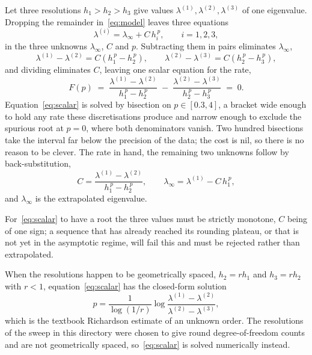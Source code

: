 \documentclass[11pt,a4paper]{article}
\begin{document}
Let three resolutions $h_1 > h_2 > h_3$ give values $\lambda^{(1)},
\lambda^{(2)}, \lambda^{(3)}$ of one eigenvalue. Dropping the remainder
in~\eqref{eq:model} leaves three equations
\begin{equation}
  \lambda^{(i)} = \lambda_\infty + C\,h_i^{\,p},
  \qquad i = 1,2,3,
  \label{eq:three}
\end{equation}
in the three unknowns $\lambda_\infty$, $C$ and $p$. Subtracting them in pairs
eliminates $\lambda_\infty$,
\begin{equation}
  \lambda^{(1)} - \lambda^{(2)} = C\left(h_1^{\,p} - h_2^{\,p}\right),
  \qquad
  \lambda^{(2)} - \lambda^{(3)} = C\left(h_2^{\,p} - h_3^{\,p}\right),
\end{equation}
and dividing eliminates $C$, leaving one scalar equation for the rate,
\begin{equation}
  F(p) \;=\;
  \frac{\lambda^{(1)} - \lambda^{(2)}}{h_1^{\,p} - h_2^{\,p}}
  \;-\;
  \frac{\lambda^{(2)} - \lambda^{(3)}}{h_2^{\,p} - h_3^{\,p}}
  \;=\; 0 .
  \label{eq:scalar}
\end{equation}
Equation~\eqref{eq:scalar} is solved by bisection on $p \in [0.3, 4]$, a bracket
wide enough to hold any rate these discretisations produce and narrow enough to
exclude the spurious root at $p = 0$, where both denominators vanish. Two hundred
bisections take the interval far below the precision of the data; the cost is
nil, so there is no reason to be clever. The rate in hand, the remaining two
unknowns follow by back-substitution,
\begin{equation}
  C = \frac{\lambda^{(1)} - \lambda^{(2)}}{h_1^{\,p} - h_2^{\,p}},
  \qquad
  \lambda_\infty = \lambda^{(1)} - C\,h_1^{\,p},
  \label{eq:back}
\end{equation}
and $\lambda_\infty$ is the extrapolated eigenvalue.

For~\eqref{eq:scalar} to have a root the three values must be strictly monotone,
$C$ being of one sign; a sequence that has already reached its rounding plateau,
or that is not yet in the asymptotic regime, will fail this and must be
rejected rather than extrapolated.

When the resolutions happen to be geometrically spaced, $h_2 = r h_1$ and $h_3 =
r h_2$ with $r < 1$, equation~\eqref{eq:scalar} has the closed-form solution
\begin{equation}
  p = \frac{1}{\log(1/r)}
      \log\!\frac{\lambda^{(1)} - \lambda^{(2)}}{\lambda^{(2)} - \lambda^{(3)}},
\end{equation}
which is the textbook Richardson estimate of an unknown order. The resolutions
of the sweep in this directory were chosen to give round degree-of-freedom
counts and are not geometrically spaced, so~\eqref{eq:scalar} is solved
numerically instead.
\end{document}
